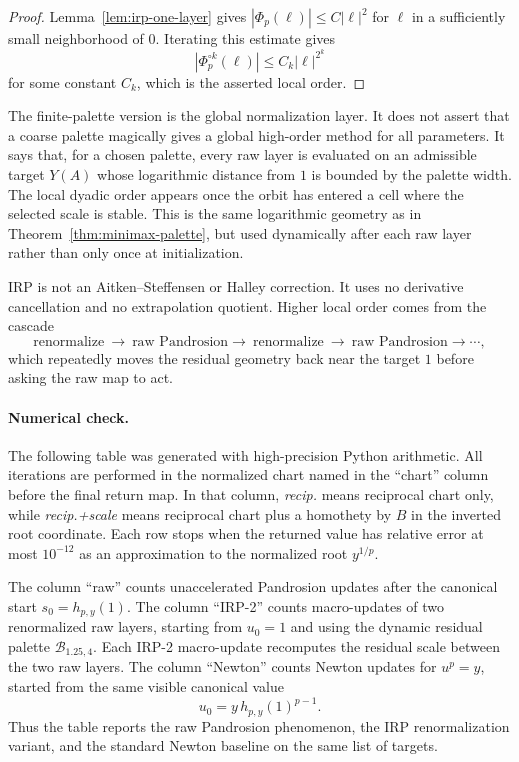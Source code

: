 \documentclass[10pt,a4paper]{article}
\theoremstyle{plain}
\theoremstyle{definition}
\theoremstyle{remark}
\newenvironment{takeaway}{%
  \begin{center}\begin{minipage}{0.92\linewidth}\small\itshape\color{blue!45!black}%
}{%
  \end{minipage}\end{center}%
}
\begin{document}
\begin{proof}
Lemma~\ref{lem:irp-one-layer} gives $|\Phi_p(\ell)|\le C|\ell|^2$ for
$\ell$ in a sufficiently small neighborhood of $0$.  Iterating this estimate
gives
\[
  |\Phi_p^{\circ k}(\ell)|
  \le C_k |\ell|^{2^k}
\]
for some constant $C_k$, which is the asserted local order.
\end{proof}

The finite-palette version is the global normalization layer.  It does not
assert that a coarse palette magically gives a global high-order method for all
parameters.  It says that, for a chosen palette, every raw layer is evaluated on
an admissible target $Y(A)$ whose logarithmic distance from $1$ is bounded by
the palette width.  The local dyadic order appears once the orbit has entered a
cell where the selected scale is stable.  This is the same logarithmic geometry
as in Theorem~\ref{thm:minimax-palette}, but used dynamically after each raw
layer rather than only once at initialization.

\begin{takeaway}
IRP is not an Aitken--Steffensen or Halley correction.  It uses no derivative
cancellation and no extrapolation quotient.  Higher local order comes from the
cascade
\[
  \text{renormalize}\ \longrightarrow\ \text{raw Pandrosion}
  \longrightarrow\ \text{renormalize}\ \longrightarrow\ \text{raw Pandrosion}
  \longrightarrow\cdots,
\]
which repeatedly moves the residual geometry back near the target $1$ before
asking the raw map to act.
\end{takeaway}


\paragraph{Numerical check.}
The following table was generated with high-precision Python arithmetic.  All
iterations are performed in the normalized chart named in the ``chart'' column
before the final return map.  In that column, \emph{recip.} means reciprocal
chart only, while \emph{recip.+scale} means reciprocal chart plus a homothety
by $B$ in the inverted root coordinate.  Each row stops when the returned value
has relative error at most $10^{-12}$ as an approximation to the normalized
root $y^{1/p}$.

The column ``raw'' counts unaccelerated Pandrosion updates after the canonical
start $s_0=h_{p,y}(1)$.  The column ``IRP-2'' counts macro-updates of two
renormalized raw layers, starting from $u_0=1$ and using the dynamic residual
palette $\mathcal B_{1.25,4}$.  Each IRP-2 macro-update recomputes the residual
scale between the two raw layers.  The column ``Newton'' counts Newton updates
for $u^p=y$, started from the same visible canonical value
\[
  u_0=y\,h_{p,y}(1)^{p-1}.
\]
Thus the table reports the raw Pandrosion phenomenon, the IRP renormalization
variant, and the standard Newton baseline on the same list of targets.
\end{document}
